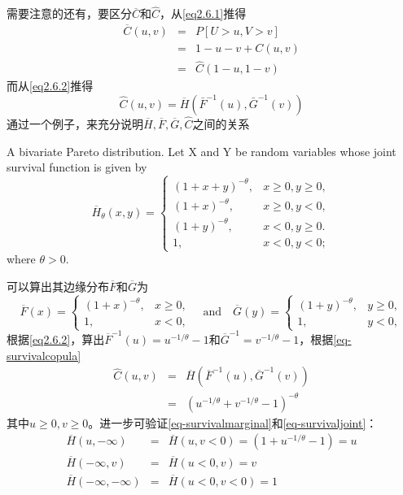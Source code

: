 需要注意的还有，要区分$\overline{C}$和$\hat{C}$，从\cref{eq2.6.1}推得
\begin{eqnarray*}
    \overline{C}(u,v) &=& P[U>u,V>v] \\
    &=& 1-u-v+C(u,v) \\
    &=& \hat{C}(1-u,1-v) 
\end{eqnarray*}
而从\cref{eq2.6.2}推得
\begin{equation}
    \hat{C}(u,v) = \overline{H}(\bar{F}^{-1}(u),\bar{G}^{-1}(v))
    \label{eq-survivalcopula}
\end{equation}
通过一个例子，来充分说明$\overline{H},\overline{F},\overline{G},\hat{C}$之间的关系
\begin{example}
    A bivariate Pareto distribution. Let X and Y be random variables whose joint survival function is given by
    \begin{equation*}
        \overline{H}_{\theta}(x,y) = 
        \begin{cases}
            (1+x+y)^{-\theta}, &x\geq0,y\geq0, \\
            (1+x)^{-\theta}, &x\geq0,y<0, \\
            (1+y)^{-\theta}, &x<0,y \geq 0.\\
            1, &x<0, y<0;
        \end{cases}
    \end{equation*}
    where $\theta >0$. 
    \label{exp2.14}
\end{example}
可以算出其边缘分布$\overline{F}$和$\overline{G}$为
\begin{equation*}
    \overline{F}(x) =
    \begin{cases}
        (1+x)^{-\theta}, &x\geq0, \\
        1, &x<0,
    \end{cases}
    \quad \text{and} \quad \overline{G}(y) = 
    \begin{cases}
        (1+y)^{-\theta}, &y\geq0, \\
        1, & y<0,
    \end{cases}
\end{equation*}
根据\cref{eq2.6.2}，算出$\overline{F}^{-1}(u)= u^{-1/\theta}-1$和$\overline{G}^{-1}=v^{-1/\theta}-1$，根据\cref{eq-survivalcopula}
\begin{eqnarray*}
    \hat{C}(u,v) &=& \overline{H}(\overline{F}^{-1}(u),\overline{G}^{-1}(v)) \\
    &=& (u^{-1/\theta}+v^{-1/\theta}-1)^{-\theta}
\end{eqnarray*}
其中$u\geq 0, v\geq 0$。进一步可验证\cref{eq-survivalmarginal}和\cref{eq-survivaljoint}：
\begin{eqnarray*}
    \overline{H}(u,-\infty) &=& \overline{H}(u,v<0)=(1+u^{-1/\theta}-1) = u \\
    \overline{H}(-\infty,v) &=& \overline{H}(u<0,v) = v \\
    \overline{H}(-\infty,-\infty) &=& \overline{H}(u<0,v<0) = 1
\end{eqnarray*}

